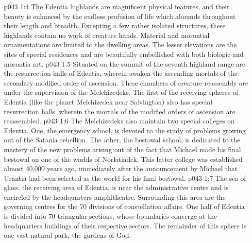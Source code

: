 \vs p043 1:4 The Edentia highlands are magnificent physical features, and their beauty is enhanced by the endless profusion of life which abounds throughout their length and breadth. Excepting a few rather isolated structures, these highlands contain no work of creature hands. Material and morontial ornamentations are limited to the dwelling areas. The lesser elevations are the sites of special residences and are beautifully embellished with both biologic and morontia art.
\vs p043 1:5 \pc Situated on the summit of the seventh highland range are the resurrection halls of Edentia, wherein awaken the ascending mortals of the secondary modified order of ascension. These chambers of creature reassembly are under the supervision of the Melchizedeks. The first of the receiving spheres of Edentia (like the planet Melchizedek near Salvington) also has special resurrection halls, wherein the mortals of the modified orders of ascension are reassembled.
\vs p043 1:6 The Melchizedeks also maintain two special colleges on Edentia. One, the emergency school, is devoted to the study of problems growing out of the Satania rebellion. The other, the bestowal school, is dedicated to the mastery of the new problems arising out of the fact that Michael made his final bestowal on one of the worlds of Norlatiadek. This latter college was established almost 40,000 years ago, immediately after the announcement by Michael that Urantia had been selected as the world for his final bestowal.
\vs p043 1:7 \pc The sea of glass, the receiving area of Edentia, is near the administrative centre and is encircled by the headquarters amphitheatre. Surrounding this area are the governing centres for the 70 divisions of constellation affairs. One half of Edentia is divided into 70 triangular sections, whose boundaries converge at the headquarters buildings of their respective sectors. The remainder of this sphere is one vast natural park, the gardens of God.
